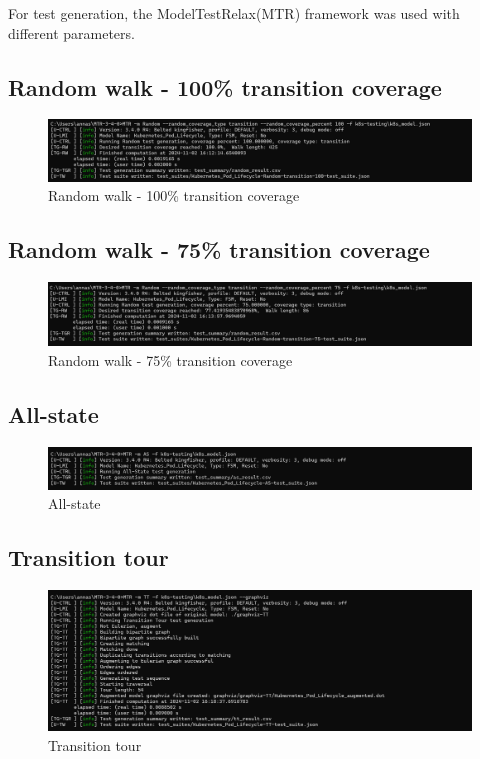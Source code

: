 \documentclass[main.tex]{subfiles}
\begin{document}
For test generation, the ModelTestRelax(MTR) framework \cite{mtr} was used with different parameters.

\subsection{Random walk - 100\% transition coverage}
\begin{figure}[H]
    \centering
    \includegraphics[width=\textwidth]{test_results/random_100coverage.png}
    \caption{Random walk - 100\% transition coverage}
    \label{fig:random_100}
\end{figure}


\subsection{Random walk - 75\% transition coverage}
\begin{figure}[H]
    \centering
    \includegraphics[width=\textwidth]{test_results/random_75coverage.png}
    \caption{Random walk - 75\% transition coverage}
    \label{fig:random_75}
\end{figure}


\subsection{All-state}
\begin{figure}[H]
    \centering
    \includegraphics[width=\textwidth]{test_results/all_state.png}
    \caption{All-state}
    \label{fig:all_state}
\end{figure}


\subsection{Transition tour}
\begin{figure}[H]
    \centering
    \includegraphics[width=\textwidth]{test_results/transition_tour_graphviz.png}
    \caption{Transition tour}
    \label{fig:transition_tour}
\end{figure}
\end{document}
